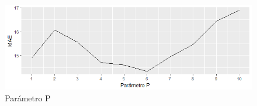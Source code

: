 \documentclass[12pt,a4paper,oneside]{article}
\begin{document}
\begin{figure} [h]
    \centering
    \centerline{\includegraphics[scale = 0.7]{Images/PP.png}}
    \caption{Parámetro P}
    \label{red}
\end{figure}
\vspace*{3\baselineskip}
\vspace*{3\baselineskip}
\vspace*{3\baselineskip}
\vspace*{3\baselineskip}
\vspace*{3\baselineskip}
\end{document}
